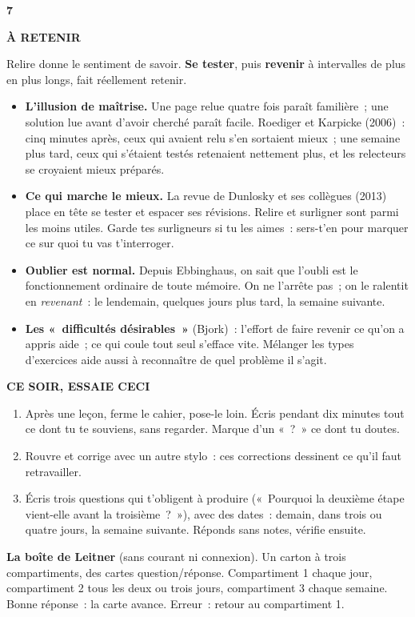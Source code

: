 \documentclass[10pt,twoside,openany]{book}
\newenvironment{aretenir}[1][À retenir]{\par\begin{tcolorbox}[enhanced,colback=creme,colframe=accent,boxrule=0pt,leftrule=3pt,arc=0pt,left=8pt,right=8pt,top=5pt,bottom=5pt,breakable]{\small\bfseries\color{accent}\MakeUppercase{#1}}\par\smallskip}{\end{tcolorbox}\par}
\newenvironment{cesoir}[1][Ce soir, essaie ceci]{\par\begin{tcolorbox}[enhanced,colback=white,colframe=vert,boxrule=0.6pt,arc=2pt,left=8pt,right=8pt,top=5pt,bottom=5pt,breakable]{\small\bfseries\color{vert}\MakeUppercase{#1}}\par\smallskip\small}{\end{tcolorbox}\par}
\newcommand{\fiche}[3]{\clearpage\markright{#2}\thispagestyle{plain}%
 {\noindent\color{accent}\fontsize{40}{40}\selectfont\bfseries #1}\hspace{0.6em}{\Large\bfseries #2\par}\vspace{0.1em}{\small\color{gris}\itshape #3\par}\vspace{0.5em}}
\begin{document}
\fiche{7}{Fermer le cahier}{Chapitre 7 du livre}
\begin{aretenir}
Relire donne le sentiment de savoir. \textbf{Se tester}, puis \textbf{revenir} à intervalles de plus en plus longs, fait réellement retenir.
\end{aretenir}
\begin{itemize}
\item \textbf{L’illusion de maîtrise.} Une page relue quatre fois paraît familière ; une solution lue avant d’avoir cherché paraît facile. Roediger et Karpicke (2006) : cinq minutes après, ceux qui avaient relu s’en sortaient mieux ; une semaine plus tard, ceux qui s’étaient testés retenaient nettement plus, et les relecteurs se croyaient mieux préparés.
\item \textbf{Ce qui marche le mieux.} La revue de Dunlosky et ses collègues (2013) place en tête se tester et espacer ses révisions. Relire et surligner sont parmi les moins utiles. Garde tes surligneurs si tu les aimes : sers-t’en pour marquer ce sur quoi tu vas t’interroger.
\item \textbf{Oublier est normal.} Depuis Ebbinghaus, on sait que l’oubli est le fonctionnement ordinaire de toute mémoire. On ne l’arrête pas ; on le ralentit en \emph{revenant} : le lendemain, quelques jours plus tard, la semaine suivante.
\item \textbf{Les « difficultés désirables »} (Bjork) : l’effort de faire revenir ce qu’on a appris aide ; ce qui coule tout seul s’efface vite. Mélanger les types d’exercices aide aussi à reconnaître de quel problème il s’agit.
\end{itemize}
\begin{cesoir}
\begin{enumerate}
\item Après une leçon, ferme le cahier, pose-le loin. Écris pendant dix minutes tout ce dont tu te souviens, sans regarder. Marque d’un « ? » ce dont tu doutes.
\item Rouvre et corrige avec un autre stylo : ces corrections dessinent ce qu’il faut retravailler.
\item Écris trois questions qui t’obligent à produire (« Pourquoi la deuxième étape vient-elle avant la troisième ? »), avec des dates : demain, dans trois ou quatre jours, la semaine suivante. Réponds sans notes, vérifie ensuite.
\end{enumerate}
\textbf{La boîte de Leitner} (sans courant ni connexion). Un carton à trois compartiments, des cartes question/réponse. Compartiment 1 chaque jour, compartiment 2 tous les deux ou trois jours, compartiment 3 chaque semaine. Bonne réponse : la carte avance. Erreur : retour au compartiment 1.
\end{cesoir}
\end{document}
